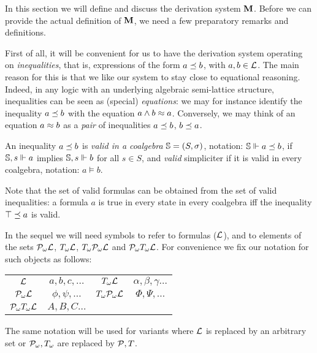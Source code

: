 \documentclass{book}
\begin{document}
In this section we will define and discuss the derivation system $\mathbf{M}$.
Before we can provide the actual definition of $\mathbf{M}$, we need a few
preparatory remarks and definitions.

First of all, it will be convenient for us to have the derivation
system operating on \emph{inequalities}, that is, expressions of the
form $a \preceq b$, with $a,b \in \mathcal{L}$.  The main reason for this is
that we like our system to stay close to equational reasoning. Indeed,
in any logic with an underlying algebraic semi-lattice structure,
inequalities can be seen as (special) \emph{equations}: we may for
instance identify the inequality $a \preceq b$ with the equation $a
\land b \approx a$.  Conversely, we may think of an equation $a \approx b$ as
a \emph{pair} of inequalities $a\preceq b$, $b\preceq a$.

\begin{definition}
  An inequality $a \preceq b$ is \emph{valid in a coalgebra}
  $\mathbb{S} = (S,\sigma)$, notation: $\mathbb{S} \Vdash a \preceq b$,
  if $\mathbb{S},s \Vdash a$ implies $\mathbb{S},s \Vdash b$ for all $s
  \in S$, and \emph{valid} simpliciter if it is valid in every
  coalgebra, notation: $a \models b$.
\end{definition}

Note that the set of valid formulas can be obtained from the set of valid 
inequalities: a formula $a$ is true in every state in every coalgebra iff the 
inequality $\top \preceq a$ is valid.

In the sequel we will need symbols to refer to formulas ($\mathcal{L}$),
and to elements of the sets $\mathcal{P}_{\omega}\mathcal{L}$, $T_{\omega}\mathcal{L}$,
$T_{\omega}\mathcal{P}_{\omega}\mathcal{L}$ and $\mathcal{P}_{\omega}T_{\omega}\mathcal{L}$.  For
convenience we fix our notation for such objects as follows:
\begin{center}
\begin{tabular}{|c|c||c|c|}
  \hline
  $\mathcal{L}$       & $a,b,c,\ldots$ &
  $T_{\omega}\mathcal{L}$   & $\alpha,\beta,\gamma\ldots$ \\
  $\mathcal{P}_{\omega}\mathcal{L}$   & $\phi,\psi,\ldots$ &
  $T_{\omega}\mathcal{P}_{\omega}\mathcal{L}$ & $\Phi,\Psi,\ldots$ \\
  $\mathcal{P}_{\omega}T_{\omega}\mathcal{L}$ & $A, B, C \ldots$ & &\\ \hline
\end{tabular}
\end{center}
The same notation will be used for variants where $\mathcal{L}$ is replaced
by an arbitrary set or $\mathcal{P}_{\omega},T_{\omega}$ are replaced by $\mathcal{P},T$.
\end{document}
